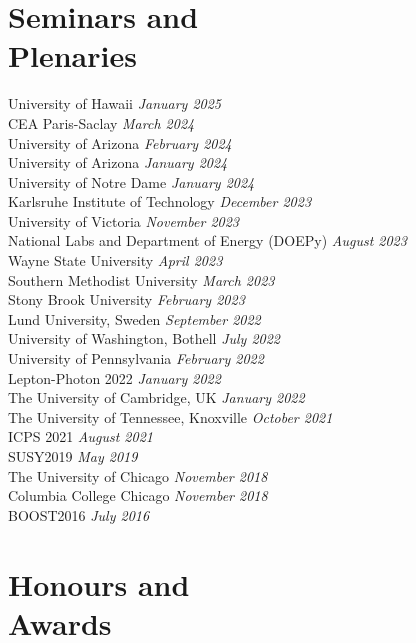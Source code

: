 \documentclass[margin,line]{resume}
\let\origsection\section%
\let\section\subsection%
\let\section\origsection%
\begin{document}
\begin{resume}
\section{\mysidestyle Seminars and\\Plenaries}
University of Hawaii \hfill \textsl{January 2025}\\
CEA Paris-Saclay \hfill \textsl{March 2024}\\
University of Arizona \hfill \textsl{February 2024}\\
University of Arizona \hfill \textsl{January 2024}\\
University of Notre Dame \hfill \textsl{January 2024}\\
Karlsruhe Institute of Technology \hfill \textsl{December 2023}\\
University of Victoria \hfill \textsl{November 2023}\\
National Labs and Department of Energy (DOEPy) \hfill \textsl{August 2023}\\
Wayne State University \hfill \textsl{April 2023}\\
Southern Methodist University \hfill \textsl{March 2023}\\
Stony Brook University \hfill \textsl{February 2023}\\
Lund University, Sweden \hfill \textsl{September 2022}\\
University of Washington, Bothell \hfill \textsl{July 2022}\\
University of Pennsylvania \hfill \textsl{February 2022}\\
Lepton-Photon 2022 \hfill \textsl{January 2022}\\
The University of Cambridge, UK \hfill \textsl{January 2022}\\
The University of Tennessee, Knoxville \hfill \textsl{October 2021}\\
ICPS 2021 \hfill \textsl{August 2021}\\
SUSY2019 \hfill \textsl{May 2019}\\
The University of Chicago \hfill \textsl{November 2018}\\
Columbia College Chicago \hfill \textsl{November 2018}\\
BOOST2016 \hfill \textsl{July 2016}


\section{\mysidestyle Honours and\\Awards}


\end{resume}
\end{document}
